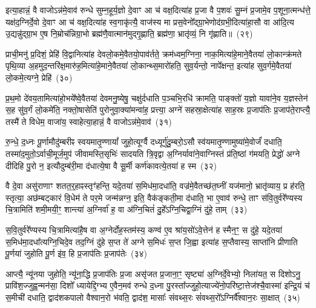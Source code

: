 इत्या॒हान्नं॒ वै वाजो\-ऽन्न॑मे॒वाव॑ रुन्धे सुम्न॒हूर्य॒ज्ञो दे॒वाꣳ आ च॑ वक्ष॒दित्या॑ह प्र॒जा वै प॒शवः॑ सु॒म्नं प्र॒जामे॒व प॒शूना॒त्मन्ध॑त्ते॒ यक्ष॑द॒ग्निर्दे॒वो दे॒वाꣳ आ च॑ वक्ष॒दित्या॑ह स्व॒गाकृ॑त्यै॒ वाज॑स्य मा प्रस॒वेनो᳚द्ग्रा॒भेणोद॑ग्रभी॒दित्या॑हा॒सौ वा आ॑दि॒त्य उ॒द्यन्नु॑द्ग्रा॒भ ए॒ष नि॒म्रोच॑न्निग्रा॒भो ब्रह्म॑णै॒वात्मान॑मुद्गृ॒ह्णाति॒ ब्रह्म॑णा॒ भ्रातृ॑व्यं॒ नि गृ॑ह्णाति॥~(२९)

{\anuvakamend[{प्रा॒णैः पोषो᳚\-ऽप्र॒त्याग्नी᳚ध्रे॒ पति॑मे॒ष दश॑ च}]}%

प्राची॒मनु॑ प्र॒दिशं॒ प्रेहि॑ वि॒द्वानित्या॑ह देवलो॒कमे॒वैतयो॒पाव॑र्तते॒ क्रम॑ध्वम॒ग्निना॒ नाक॒मित्या॑हे॒माने॒वैतया॑ लो॒कान्क्र॑मते पृथि॒व्या अ॒हमुद॒न्तरि॑क्ष॒मारु॑ह॒मित्या॑हे॒माने॒वैतया॑ लो॒कान्थ्स॒मारो॑हति॒ सुव॒र्यन्तो॒ नापे᳚क्षन्त॒ इत्या॑ह सुव॒र्गमे॒वैतया॑ लो॒कमे॒त्यग्ने॒ प्रेहि॑~(३०)

प्र॒थ॒मो दे॑वय॒तामित्या॑हो॒भये᳚ष्वे॒वैतया॑ देवमनु॒ष्येषु॒ चक्षु॑र्दधाति प॒ञ्चभि॒रधि॑ क्रामति॒ पाङ्क्तो॑ य॒ज्ञो यावा॑ने॒व य॒ज्ञस्तेन॑ स॒ह सु॑व॒र्गं लो॒कमे॑ति॒ नक्तो॒षासेति॑ पुरोनुवा॒क्या॑मन्वा॑ह॒ प्रत्त्या॒ अग्ने॑ सहस्रा॒क्षेत्या॑ह साह॒स्रः प्र॒जा\-प॑तिः प्र॒जा\-प॑ते॒राप्त्यै॒ तस्मै॑ ते विधेम॒ वाजा॑य॒ स्वाहेत्या॒हान्नं॒ वै वाजो\-ऽन्न॑मे॒वाव॑~(३१)

रु॒न्धे॒ द॒ध्नः पू॒र्णामौदु॑म्बरीꣴ स्वयमातृ॒ण्णायां᳚ जुहो॒त्यूर्ग्वै दध्यूर्गु॑दु॒म्बरो॒\-ऽसौ स्व॑यमातृ॒ण्णामुष्या॑मे॒वोर्जं॑ दधाति॒ तस्मा॑द॒मुतो॒\-ऽर्वाची॒मूर्ज॒मुप॑ जीवामस्ति॒सृभिः॑ सादयति त्रि॒वृद्वा अ॒ग्निर्यावा॑ने॒वाग्निस्तं प्र॑ति॒ष्ठां ग॑मयति॒ प्रेद्धो॑ अग्ने दीदिहि पु॒रो न॒ इत्यौदुम्ब॑री॒मा द॑धात्ये॒षा वै सू॒र्मी कर्ण॑कावत्ये॒तया॑ ह स्म~(३२)

वै दे॒वा असु॑राणाꣳ शतत॒र्॒\mbox{}हाꣴस्तृꣳ॑हन्ति॒ यदे॒तया॑ स॒मिध॑मा॒दधा॑ति॒ वज्र॑मे॒वैतच्छ॑त॒घ्नीं यज॑मानो॒ भ्रातृ॑व्याय॒ प्र ह॑रति॒ स्तृत्या॒ अछ॑म्बट्कारं वि॒धेम॑ ते पर॒मे जन्म॑न्नग्न॒ इति॒ वैक॑ङ्कती॒मा द॑धाति॒ भा ए॒वाव॑ रुन्धे॒ ताꣳ स॑वि॒तुर्वरे᳚ण्यस्य चि॒त्रामिति॑ शमी॒मयी॒ꣳ॒ शान्त्या॑ अ॒ग्निर्वा॑ ह॒ वा अ॑ग्नि॒चितं॑ दु॒हे᳚\-ऽग्नि॒चिद्वा॒ग्निं दु॑हे॒ ताम्~(३३)

स॒वि॒तुर्वरे᳚ण्यस्य चि॒त्रामित्या॑है॒ष वा अ॒ग्नेर्दोह॒स्तम॑स्य॒ कण्व॑ ए॒व श्रा॑य॒सो॑\-ऽवे॒त्तेन॑ ह स्मैन॒ꣳ॒ स दु॑हे॒ यदे॒तया॑ स॒मिध॑मा॒दधा᳚त्यग्नि॒चिदे॒व तद॒ग्निं दु॑हे स॒प्त ते॑ अग्ने स॒मिधः॑ स॒प्त जि॒ह्वा इत्या॑ह स॒प्तैवास्य॒ साप्ता॑नि प्रीणाति पू॒र्णया॑ जुहोति पू॒र्ण इ॑व॒ हि प्र॒जा\-प॑तिः प्र॒जा\-प॑तेः~(३४)

आप्त्यै॒ न्यू॑नया जुहोति॒ न्यू॑ना॒द्धि प्र॒जा\-प॑तिः प्र॒जा असृ॑जत प्र॒जाना॒ꣳ॒ सृष्ट्या॑ अ॒ग्निर्दे॒वेभ्यो॒ निला॑यत॒ स दिशो\-ऽनु॒ प्रावि॑श॒ज्जुह्व॒न्मन॑सा॒ दिशो᳚ ध्यायेद्दि॒ग्भ्य ए॒वैन॒मव॑ रुन्धे द॒ध्ना पु॒रस्ता᳚ज्जुहो॒त्याज्ये॑नो॒परि॑ष्टा॒त्तेज॑श्चै॒वास्मा॑ इन्द्रि॒यं च॑ स॒मीची॑ दधाति॒ द्वाद॑श\-कपालो वैश्वान॒रो भ॑वति॒ द्वाद॑श॒ मासाः᳚ संवथ्स॒रः सं॑वथ्स॒रो᳚\-ऽग्निर्वै᳚श्वान॒रः सा॒क्षात्~(३५)

